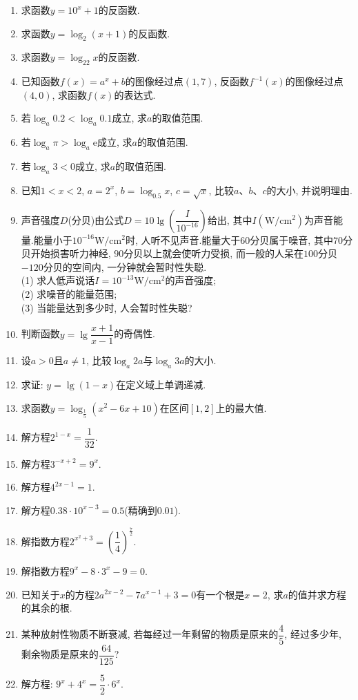 \documentclass[10pt,a4paper]{article}
\begin{document}
\begin{enumerate}[1.]
\item 求函数$y=10^x+1$的反函数.
\item 求函数$y=\log _2(x+1)$的反函数.
\item 求函数$y=\log _22x$的反函数.
\item 已知函数$f(x)=a^x+b$的图像经过点$(1, 7)$, 反函数$f^{-1}(x)$的图像经过点$(4, 0)$, 求函数$f(x)$的表达式.
\item 若$\log _a0.2<\log _a0.1$成立, 求$a$的取值范围.
\item 若$\log _a\pi >\log _a\mathrm{e}$成立, 求$a$的取值范围.
\item 若$\log _a3<0$成立, 求$a$的取值范围.
\item 已知$1<x<2$, $a=2^x$, $b=\log _{0.5}x$, $c=\sqrt x$, 比较$a$、$b$、$c$的大小, 并说明理由.
\item 声音强度$D$(分贝)由公式$D=10\lg (\dfrac I{10^{-16}})$给出, 其中$I(\text{W}/\text{cm}^2)$为声音能量.能量小于$10^{-16}\text{W}/\text{cm}^2$时, 人听不见声音.能量大于$60$分贝属于噪音, 其中$70$分贝开始损害听力神经, $90$分贝以上就会使听力受损, 而一般的人呆在$100$分贝$-120$分贝的空间内, 一分钟就会暂时性失聪.\\
(1) 求人低声说话$I=10^{-13}\text{W}/\text{cm}^2$的声音强度;\\
(2) 求噪音的能量范围;\\
(3) 当能量达到多少时, 人会暂时性失聪?
\item 判断函数$y=\lg\dfrac{x+1}{x-1}$的奇偶性.
\item 设$a>0$且$a\ne 1$, 比较$\log _a2a$与$\log _a3a$的大小.
\item 求证: $y=\lg(1-x)$在定义域上单调递减.
\item 求函数$y=\log _{\frac 15}(x^2-6x+10)$在区间$[1,2]$上的最大值.
\item 解方程$2^{1-x}=\dfrac 1{32}$.
\item 解方程$3^{-x+2}=9^x$.
\item 解方程$4^{2x-1}=1$.
\item 解方程$0.38\cdot 10^{x-3}=0.5$(精确到$0.01$).
\item 解指数方程$2^{x^2+3}=(\dfrac 14)^{\frac 72}$.
\item 解指数方程$9^x-8\cdot 3^x-9=0$.
\item 已知关于$x$的方程$2a^{2x-2}-7a^{x-1}+3=0$有一个根是$x=2$, 求$a$的值并求方程的其余的根.
\item 某种放射性物质不断衰减, 若每经过一年剩留的物质是原来的$\dfrac 45$, 经过多少年, 剩余物质是原来的$\dfrac{64}{125}$?
\item 解方程: $9^x+4^x=\dfrac 52\cdot 6^x$.

\end{enumerate}
\end{document}
